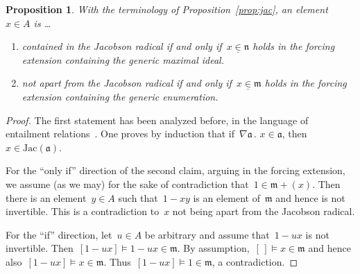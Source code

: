 \documentclass[com,11pt,crcready]{iosart2x}
\theoremstyle{definition}
\theoremstyle{plain}
\newtheorem{proposition}[definition]{Proposition}
\theoremstyle{remark}
\newcommand{\?}{\,{:}\,}
\newcommand{\aaa}{\mathfrak{a}}
\newcommand{\mmm}{\mathfrak{m}}
\newcommand{\nnn}{\mathfrak{n}}
\renewcommand{\_}{\mathpunct{.}\,}
\begin{document}
\begin{proposition}\label{prop:mmm-nnn}With the terminology of
Proposition~\ref{prop:jac}, an element~$x \in A$ is \ldots \begin{enumerate}
\item[(a)] contained in the Jacobson radical if and only if~$x
\mathrel{\underline{\in}} \nnn$ holds in the forcing extension containing the
generic maximal ideal.
\item[(b)] not apart from the Jacobson radical if and only if~$x
\mathrel{\underline{\in}} \mmm$ holds in the forcing extension containing the
generic enumeration.
\end{enumerate}
\end{proposition}

\begin{proof}The first statement has been analyzed before, in the language of
entailment relations~\cite[Corollary~2]{schuster-wessel:krull}. One proves by
induction that if~$\nabla\aaa\_ x \in \aaa$, then~$x \in \mathrm{Jac}(\aaa)$.

For the ``only if'' direction of the second claim, arguing in the forcing extension,
we assume (as we may) for the sake of contradiction that~$1 \in \mmm + (x)$.
Then there is an element~$y \in A$ such that~$1 - xy$ is an element of~$\mmm$ and
hence is not invertible. This is a contradiction to~$x$ not being apart from
the Jacobson radical.

For the ``if'' direction, let~$u \in A$ be arbitrary and assume that~$1 -
ux$ is not invertible. Then~$[1-ux] \models 1-ux \in \mmm$. By assumption,~$[\,]
\models x \in \mmm$ and hence also~$[1-ux] \models x \in \mmm$. Thus~$[1-ux]
\models 1 \in \mmm$, a contradiction.
\end{proof}
\end{document}
